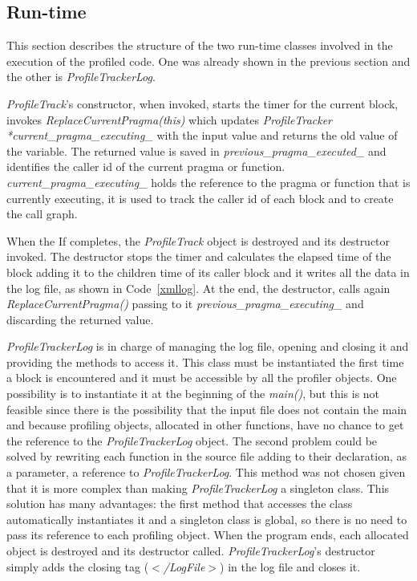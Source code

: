 \documentclass[a4paper,12pt,oneside]{book}
\begin{document}
\subsection{Run-time}
\label{profilerun}

This section describes the structure of the two run-time classes involved in the execution of the profiled code. One was already shown in the previous section and the other is \emph{ProfileTrackerLog}. 

\emph{ProfileTrack}’s constructor, when invoked, starts the timer for the current block, invokes \emph{ReplaceCurrentPragma(this)} which updates \emph{ProfileTracker} \\ \emph{*current\_pragma\_executing\_} with the input value and returns the old value of the variable. The returned value is saved in \emph{previous\_pragma\_executed\_} and identifies the caller id of the current pragma or function. \emph{current\_pragma\_executing\_} holds the reference to the pragma or function that is currently executing, it is used to track the caller id of each block and to create the call graph. 

When the If completes, the \emph{ProfileTrack} object is destroyed and its destructor invoked. The destructor stops the timer and calculates the elapsed time of the block adding it to the children time of its caller block and it writes all the data in the log file, as shown in Code~\ref{xmllog}. At the end, the destructor, calls again \emph{ReplaceCurrentPragma()} passing to it \emph{previous\_pragma\_executing\_} and discarding the returned value.

\emph{ProfileTrackerLog} is in charge of managing the log file, opening and closing it and providing the methods to access it. This class must be instantiated the first time a block is encountered and it must be accessible by all the profiler objects. One possibility is to instantiate it at the beginning of the \emph{main()}, but this is not feasible since there is the possibility that the input file does not contain the main and because profiling objects, allocated in other functions, have no chance to get the reference to the \emph{ProfileTrackerLog} object. The second problem could be solved by rewriting each function in the source file adding to their declaration, as a parameter, a reference to \emph{ProfileTrackerLog}. This method was not chosen given that it is more complex than making \emph{ProfileTrackerLog} a singleton class. This solution has many advantages: the first method that accesses the class automatically instantiates it and a singleton class is global, so there is no need to pass its reference to each profiling object. When the program ends, each allocated object is destroyed and its destructor called. \emph{ProfileTrackerLog}'s destructor simply adds the closing tag (\emph{$<$/LogFile$>$}) in the log file and closes it.
\end{document}
